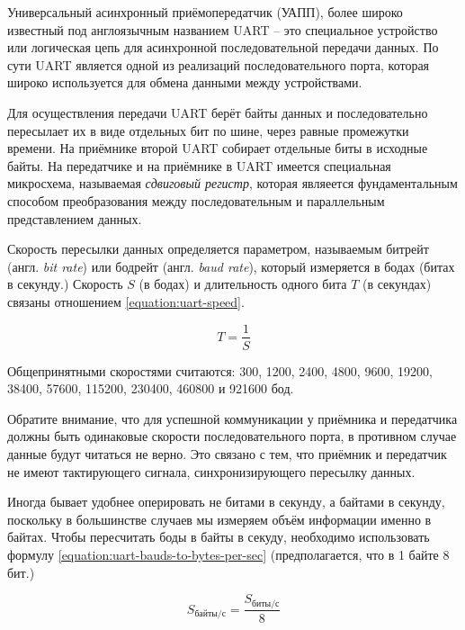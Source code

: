 \documentclass[../sparc.tex]{subfiles}
\begin{document}
Универсальный асинхронный приёмопередатчик (\gls{УАПП}), более широко известный
под англоязычным названием \gls{UART} -- это специальное устройство или
логическая цепь для асинхронной последовательной передачи данных.  По сути UART
является одной из реализаций последовательного порта, которая широко
используется для обмена данными между устройствами.

Для осуществления передачи UART берёт байты данных и последовательно пересылает
их в виде отдельных бит по шине, через равные промежутки времени.  На приёмнике
второй UART собирает отдельные биты в исходные байты.  На передатчике и на
приёмнике в UART имеется специальная микросхема, называемая \emph{сдвиговый
регистр}, которая являеется фундаментальным способом преобразования между
последовательным и параллельным представлением данных.

Скорость пересылки данных определяется параметром, называемым битрейт
(англ. \emph{bit rate}) или бодрейт (англ. \emph{baud rate}), который измеряется
в бодах (битах в секунду.)  Скорость $S$ (в бодах) и длительность одного бита
$T$ (в секундах) связаны отношением \ref{equation:uart-speed}.

\begin{equation}
  T = \frac{1}{S}
  \label{equation:uart-speed}
\end{equation}

Общепринятными скоростями считаются: 300, 1200, 2400, 4800, 9600, 19200, 38400,
57600, 115200, 230400, 460800 и 921600 бод.


Обратите внимание, что для успешной коммуникации у приёмника и передатчика
должны быть одинаковые скорости последовательного порта, в противном случае
данные будут читаться не верно.  Это связано с тем, что приёмник и передатчик не
имеют тактирующего сигнала, синхронизирующего пересылку данных.

Иногда бывает удобнее оперировать не битами в секунду, а байтами в секунду,
поскольку в большинстве случаев мы измеряем объём информации именно в байтах.
Чтобы пересчитать боды в байты в секуду, необходимо использовать формулу
\ref{equation:uart-bauds-to-bytes-per-sec} (предполагается, что в 1 байте 8
бит.)

\begin{equation}
  S_{\mbox{байты/с}} = \frac{S_{\mbox{биты/с}}}{8}
  \label{equation:uart-bauds-to-bytes-per-sec}
\end{equation}
\end{document}
